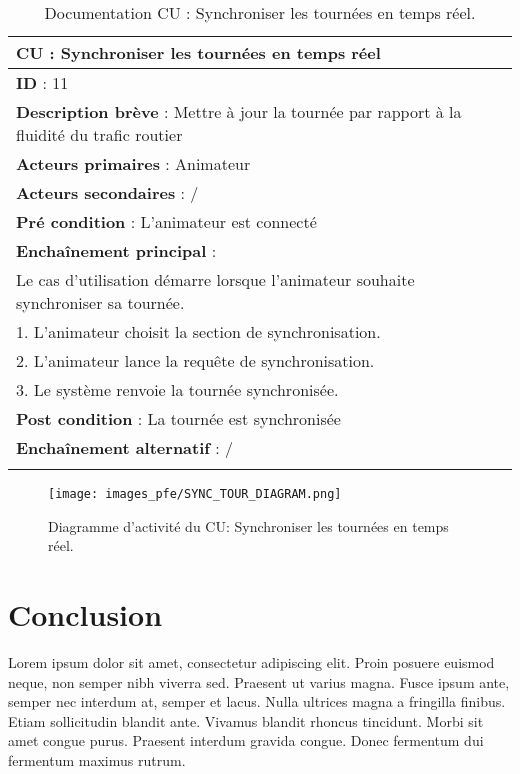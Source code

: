 \renewcommand{\arraystretch}{1.5}
\begin{xltabular}{\linewidth}{|X|}
    \hline
    \textbf{CU} : Synchroniser les tournées en temps réel     \\\hline
    \textbf{ID} :  11    \\\hline
    \textbf{Description brève} :  Mettre à jour la tournée par rapport à la fluidité du trafic routier    \\\hline
    \textbf{Acteurs primaires} :  Animateur    \\\hline
    \textbf{Acteurs secondaires} :   /   \\\hline
    \textbf{Pré condition} :   L'animateur est connecté   \\\hline
    \textbf{Enchaînement principal} :   \\
    Le cas d'utilisation démarre lorsque l'animateur souhaite synchroniser sa tournée.\\
    1. L'animateur choisit la section de synchronisation.\\
    2. L'animateur lance la requête de synchronisation.\\
    3. Le système renvoie la tournée synchronisée.
    \\\hline
    \textbf{Post condition} :  La tournée est synchronisée    \\\hline
    \textbf{Enchaînement alternatif} :  /    \\\hline

    \caption{Documentation CU : Synchroniser les tournées en temps réel.}
    \label{tab:cu-specs5}
\end{xltabular}
\FloatBarrier

\begin{figure}[hbt!]
    \centering
    \texttt{[image: images\_pfe/SYNC\_TOUR\_DIAGRAM.png]}
    \caption{Diagramme d'activité du CU: Synchroniser les tournées en temps réel.}
    \label{fig:activity-animator}
\end{figure}
\FloatBarrier

\section{Conclusion}
Lorem ipsum dolor sit amet, consectetur adipiscing elit. Proin posuere euismod neque, non semper nibh viverra sed. Praesent ut varius magna. Fusce ipsum ante, semper nec interdum at, semper et lacus. Nulla ultrices magna a fringilla finibus. Etiam sollicitudin blandit ante. Vivamus blandit rhoncus tincidunt. Morbi sit amet congue purus. Praesent interdum gravida congue. Donec fermentum dui fermentum maximus rutrum.


